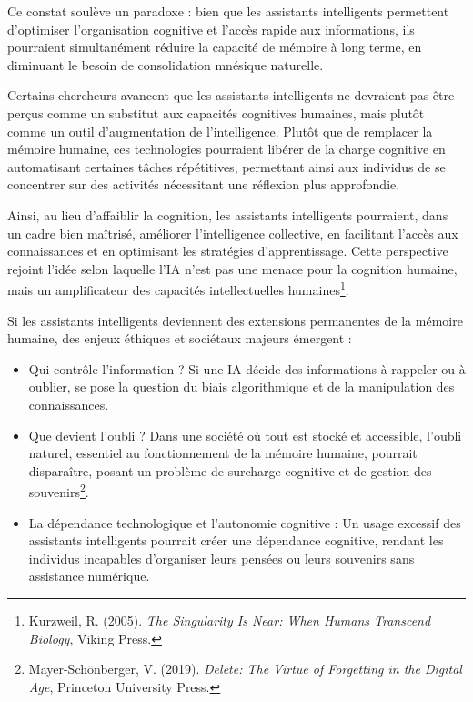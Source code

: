 \documentclass[12pt,a4paper]{report}
\begin{document}
Ce constat soulève un paradoxe : bien que les assistants intelligents permettent d’optimiser l’organisation cognitive et l’accès rapide aux informations, ils pourraient simultanément réduire la capacité de mémoire à long terme, en diminuant le besoin de consolidation mnésique naturelle.

Certains chercheurs avancent que les assistants intelligents ne devraient pas être perçus comme un substitut aux capacités cognitives humaines, mais plutôt comme un outil d’augmentation de l’intelligence. Plutôt que de remplacer la mémoire humaine, ces technologies pourraient libérer de la charge cognitive en automatisant certaines tâches répétitives, permettant ainsi aux individus de se concentrer sur des activités nécessitant une réflexion plus approfondie.

Ainsi, au lieu d’affaiblir la cognition, les assistants intelligents pourraient, dans un cadre bien maîtrisé, améliorer l’intelligence collective, en facilitant l’accès aux connaissances et en optimisant les stratégies d’apprentissage. Cette perspective rejoint l’idée selon laquelle l’IA n’est pas une menace pour la cognition humaine, mais un amplificateur des capacités intellectuelles humaines\footnote{Kurzweil, R. (2005). \textit{The Singularity Is Near: When Humans Transcend Biology}, Viking Press.}.


Si les assistants intelligents deviennent des extensions permanentes de la mémoire humaine, des enjeux éthiques et sociétaux majeurs émergent :

\begin{itemize}

    \item Qui contrôle l’information ? Si une IA décide des informations à rappeler ou à oublier, se pose la question du biais algorithmique et de la manipulation des connaissances.

    \item Que devient l’oubli ? Dans une société où tout est stocké et accessible, l’oubli naturel, essentiel au fonctionnement de la mémoire humaine, pourrait disparaître, posant un problème de surcharge cognitive et de gestion des souvenirs\footnote{Mayer-Schönberger, V. (2019). \textit{Delete: The Virtue of Forgetting in the Digital Age}, Princeton University Press.}.

    \item La dépendance technologique et l’autonomie cognitive : Un usage excessif des assistants intelligents pourrait créer une dépendance cognitive, rendant les individus incapables d’organiser leurs pensées ou leurs souvenirs sans assistance numérique.

\end{itemize}
\end{document}
